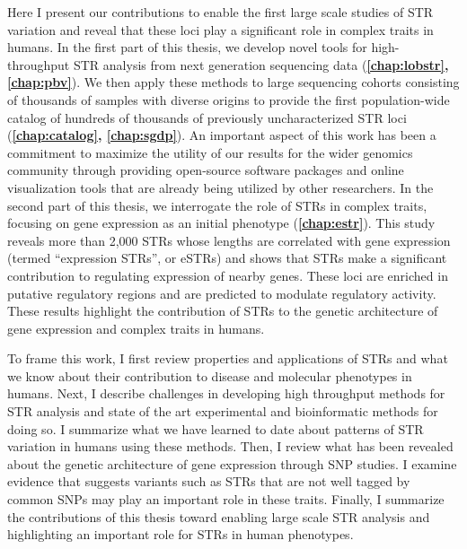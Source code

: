 Here I present our contributions to enable the first large scale studies of STR variation and reveal that these loci play a significant role in complex traits in humans. In the first part of this thesis, we develop novel tools for high-throughput STR analysis from next generation sequencing data (\textbf{\autoref{chap:lobstr}, \autoref{chap:pbv}}). We then apply these methods to large sequencing cohorts consisting of thousands of samples with diverse origins to provide the first population-wide catalog of hundreds of thousands of previously uncharacterized STR loci (\textbf{\autoref{chap:catalog}, \autoref{chap:sgdp}}). An important aspect of this work has been a commitment to maximize the utility of our results for the wider genomics community through providing open-source software packages and online visualization tools that are already being utilized by other researchers. In the second part of this thesis, we interrogate the role of STRs in complex traits, focusing on gene expression as an initial phenotype (\textbf{\autoref{chap:estr}}). This study reveals more than 2,000 STRs whose lengths are correlated with gene expression (termed ``expression STRs'', or eSTRs) and shows that STRs make a significant contribution to regulating expression of nearby genes. These loci are enriched in putative regulatory regions and are predicted to modulate regulatory activity. These results highlight the contribution of STRs to the genetic architecture of gene expression and complex traits in humans.

To frame this work, I first review properties and applications of STRs and what we know about their contribution to disease and molecular phenotypes in humans. Next, I describe challenges in developing high throughput methods for STR analysis and state of the art experimental and bioinformatic methods for doing so. I summarize what we have learned to date about patterns of STR variation in humans using these methods. Then, I review what has been revealed about the genetic architecture of gene expression through SNP studies. I examine evidence that suggests variants such as STRs that are not well tagged by common SNPs may play an important role in these traits. Finally, I summarize the contributions of this thesis toward enabling large scale STR analysis and highlighting an important role for STRs in human phenotypes.

